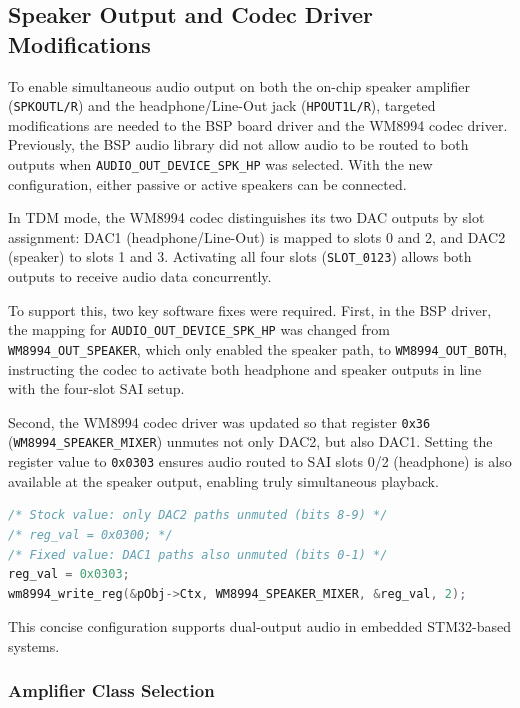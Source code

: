 \subsection{Speaker Output and Codec Driver Modifications}
\label{sec:speaker}
To enable simultaneous audio output on both the on-chip speaker amplifier \linebreak (\texttt{SPKOUTL/R}) and the headphone/Line-Out jack (\texttt{HPOUT1L/R}), targeted modifications are needed to the BSP board driver and the WM8994 codec driver. Previously, the BSP audio library did not allow audio to be routed to both outputs when \texttt{AUDIO\_OUT\_DEVICE\_SPK\_HP} was selected. With the new configuration, either passive or active speakers can be connected.

In TDM mode, the WM8994 codec distinguishes its two DAC outputs by slot assignment: DAC1 (headphone/Line-Out) is mapped to slots 0 and 2, and DAC2 (speaker) to slots 1 and 3. Activating all four slots (\texttt{SLOT\_0123}) allows both outputs to receive audio data concurrently.

To support this, two key software fixes were required. First, in the BSP driver, the mapping for \texttt{AUDIO\_OUT\_DEVICE\_SPK\_HP} was changed from  \linebreak\texttt{WM8994\_OUT\_SPEAKER}, which only enabled the speaker path, to \texttt{WM8994\_OUT\_BOTH}, instructing the codec to activate both headphone and speaker outputs in line with the four-slot SAI setup.

Second, the WM8994 codec driver was updated so that register \texttt{0x36} \linebreak (\texttt{WM8994\_SPEAKER\_MIXER}) unmutes not only DAC2, but also DAC1. Setting the register value to \texttt{0x0303} ensures audio routed to SAI slots 0/2 (headphone) is also available at the speaker output, enabling truly simultaneous playback.

\begin{lstlisting}[language=C,
  caption={WM8994 speaker mixer fix in \texttt{wm8994.c} to enable simultaneous headphone and speaker output.}]
    /* Stock value: only DAC2 paths unmuted (bits 8-9) */
/* reg_val = 0x0300; */
/* Fixed value: DAC1 paths also unmuted (bits 0-1) */
reg_val = 0x0303;
wm8994_write_reg(&pObj->Ctx, WM8994_SPEAKER_MIXER, &reg_val, 2);
\end{lstlisting}

This concise configuration supports dual-output audio in embedded STM32-based systems.

\subsubsection{Amplifier Class Selection}

